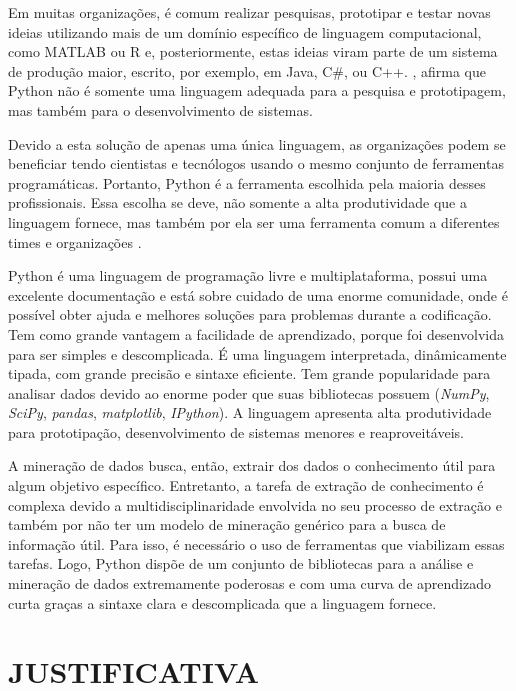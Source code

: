 Em muitas organizações, é comum realizar pesquisas, prototipar e testar novas ideias utilizando mais de um domínio específico de linguagem computacional, como MATLAB ou R e, posteriormente, estas ideias viram parte de um sistema de produção maior, escrito, por exemplo, em Java, C\#, ou C++. , afirma que Python não é somente uma linguagem adequada para a pesquisa e prototipagem, mas também para o desenvolvimento de sistemas.

Devido a esta solução de apenas uma única linguagem, as organizações podem se beneficiar tendo cientistas e tecnólogos usando o mesmo conjunto de ferramentas programáticas. Portanto, Python é a ferramenta escolhida pela maioria desses profissionais. Essa escolha se deve, não somente a alta produtividade que a linguagem fornece, mas também por ela ser uma ferramenta comum a diferentes times e organizações \cite{kaldero}. 

Python é uma linguagem de programação livre e multiplataforma, possui uma excelente documentação e está sobre cuidado de uma enorme comunidade, onde é possível obter ajuda e melhores soluções para problemas durante a codificação. Tem como grande vantagem a facilidade de aprendizado, porque foi desenvolvida para ser simples e descomplicada. É uma linguagem interpretada, dinâmicamente tipada, com grande precisão e sintaxe eficiente. Tem grande popularidade para analisar dados devido ao enorme poder que suas bibliotecas possuem (\textit{NumPy}, \textit{SciPy}, \textit{pandas}, \textit{matplotlib}, \textit{IPython}). A linguagem apresenta alta produtividade para prototipação, desenvolvimento de sistemas menores e reaproveitáveis.

A mineração de dados busca, então, extrair dos dados o conhecimento útil para algum objetivo específico. Entretanto, a tarefa de extração de conhecimento é complexa devido a multidisciplinaridade envolvida no seu processo de extração e também por não ter um modelo de mineração genérico para a busca de informação útil. Para isso, é necessário o uso de ferramentas que viabilizam essas tarefas. Logo, Python dispõe de um conjunto de bibliotecas para a análise e mineração de dados extremamente poderosas e com uma curva de aprendizado curta graças a sintaxe clara e descomplicada que a linguagem fornece.


\section{JUSTIFICATIVA}\label{sec:justificativa}

